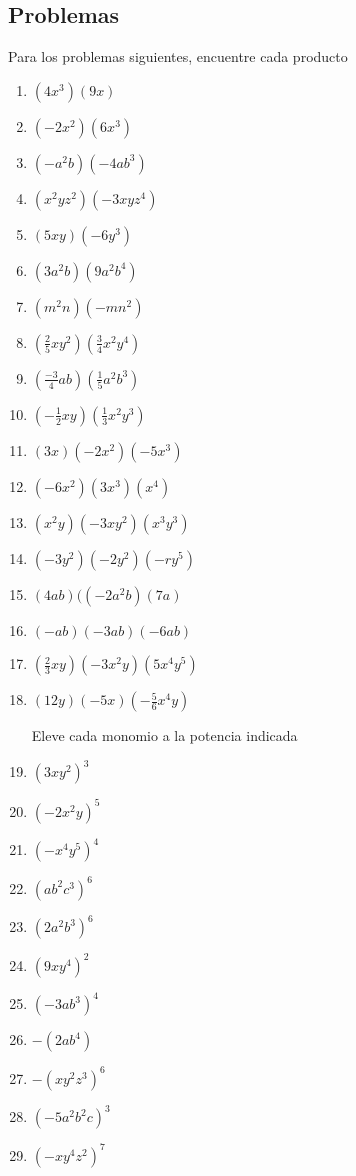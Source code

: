 \documentclass[letterpaper,11pt,twoside]{article}
\begin{document}
\begin{multicols}{2}
 \subsection*{Problemas}
 Para los problemas siguientes, encuentre cada producto
 \begin{enumerate}
 \item $(4x^{3})(9x)$
 \item $(-2x^{2})(6x^{3})$
 \item $(-a^{2}b)(-4ab^{3})$
 \item $(x^{2}yz^{2})(-3xyz^{4})$
 \item $(5xy)(-6y^{3})$
 \item $(3a^{2}b)(9a^{2}b^{4})$
 \item $(m^{2}n)(-mn^{2})$
 \item $\left(\frac{2}{5}xy^{2}\right)\left(\frac{3}{4}x^{2}y^{4}\right)$
 \item $\left(\frac{-3}{4}ab\right)\left(\frac{1}{5}a^{2}b^{3}\right)$
 \item $\left(-\frac{1}{2}xy\right)\left(\frac{1}{3}x^{2}y^{3}\right)$
 \item $(3x)(-2x^{2})(-5x^{3})$
 \item $(-6x^{2})(3x^{3})(x^{4})$
 \item $(x^{2}y)(-3xy^{2})(x^{3}y^{3})$
 \item $(-3y^{2})(-2y^{2})(-ry^{5})$
 \item $(4ab)((-2a^{2}b)(7a)$
 \item $(-ab)(-3ab)(-6ab)$
 \item $\left(\frac{2}{3}xy\right)(-3x^{2}y)(5x^{4}y^{5})$
 \item $(12y)(-5x)\left(-\frac{5}{6}x^{4}y\right)$

Eleve cada monomio a la potencia indicada

 \item $(3xy^{2})^{3}$
 \item $(-2x^{2}y)^{5}$
 \item $(-x^{4}y^{5})^{4}$
 \item $(ab^{2}c^{3})^{6}$
 \item $(2a^{2}b^{3})^{6}$
 \item $(9xy^{4})^{2}$
 \item $(-3ab^{3})^{4}$
 \item $-(2ab^{4})$
 \item $-(xy^{2}z^{3})^{6}$
 \item $(-5a^{2}b^{2}c)^{3}$
 \item $(-xy^{4}z^{2})^{7}$
 

\end{enumerate}
\end{multicols}
\end{document}
